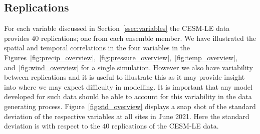 \subsection{Replications}
For each variable discussed in Section~\ref{ssec:variables} the CESM-LE data provides $40$ replications; one from each ensemble member.
We have illustrated the spatial and temporal correlations in the four variables in the Figures~\ref{fig:precip_overview},~\ref{fig:pressure_overview},~\ref{fig:temp_overview}, and~\ref{fig:wind_overview} for a single simulation.
However we also have variability between replications and it is useful to illustrate this as it may provide insight into where we may expect difficulty in modelling.
It is important that any model developed for such data should be able to account for this variability in the data generating process.
Figure~\ref{fig:std_overview} displays a snap shot of the standard deviation of the respective variables at all sites in June 2021.
Here the standard deviation is with respect to the $40$ replications of the CESM-LE data.

